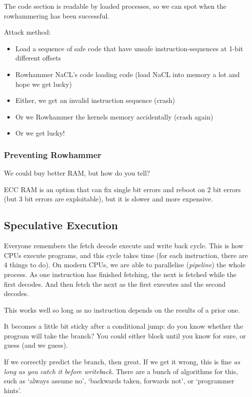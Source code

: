 \documentclass[11pt,a4paper,titlepage,dvipsnames,cmyk]{scrartcl}
\begin{document}
The code section is readable by loaded processes, so we can spot when the rowhammering has been successful.

Attack method:
\begin{itemize}
    \item Load a sequence of safe code that have unsafe instruction-sequences at 1-bit different offsets
    \item Rowhammer NaCL's code loading code (load NaCL into memory a lot and hope we get lucky)
    \item Either, we get an invalid instruction sequence (crash)
    \item Or we Rowhammer the kernels memory accidentally (crash again)
    \item Or we get lucky!
\end{itemize}

\subsubsection{Preventing Rowhammer}
We could buy better RAM, but how do you tell?

ECC RAM is an option that can fix single bit errors and reboot on 2 bit errors (but 3 bit errors are exploitable), but it is slower and more expensive.

\subsection{Speculative Execution}
Everyone remembers the fetch decode execute and write back cycle. This is how CPUs execute programs, and this cycle takes time (for each instruction, there are 4 things to do). On modern CPUs, we are able to parallelise (\textit{pipeline}) the whole process. As one instruction has finished fetching, the next is fetched while the first decodes. And then fetch the next as the first executes and the second decodes.

This works well so long as no instruction depends on the results of a prior one.

It becomes a little bit sticky after a conditional jump: do you know whether the program will take the branch? You could either block until you know for sure, or guess (and we guess).

If we correctly predict the branch, then great. If we get it wrong, this is fine \textit{as long as you catch it before writeback}. There are a bunch of algorithms for this, such as `always assume no', `backwards taken, forwards not', or `programmer hints'.
\end{document}
